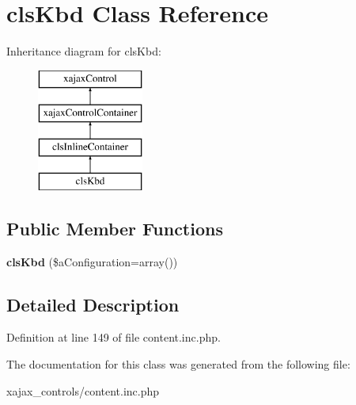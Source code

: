 \hypertarget{classclsKbd}{
\section{clsKbd Class Reference}
\label{classclsKbd}
}
Inheritance diagram for clsKbd:\begin{figure}[H]
\begin{center}
\leavevmode
\includegraphics[height=4.000000cm]{classclsKbd}
\end{center}
\end{figure}
\subsection*{Public Member Functions}
\begin{DoxyCompactItemize}
\item 
\hypertarget{classclsKbd_a47731a6c5672f0fdfc0703fb737351c4}{
{\bfseries clsKbd} (\$aConfiguration=array())}
\label{classclsKbd_a47731a6c5672f0fdfc0703fb737351c4}

\end{DoxyCompactItemize}


\subsection{Detailed Description}


Definition at line 149 of file content.inc.php.



The documentation for this class was generated from the following file:\begin{DoxyCompactItemize}
\item 
xajax\_\-controls/content.inc.php\end{DoxyCompactItemize}
